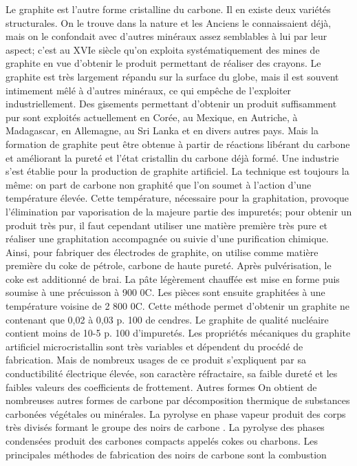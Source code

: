 \documentclass[]{article}
\begin{document}
Le graphite est l'autre forme cristalline du carbone. Il en
existe deux variétés structurales. On le trouve dans la nature
et les Anciens le connaissaient déjà, mais on le confondait avec
d'autres minéraux assez semblables à lui par leur aspect; c'est
au XVIe siècle qu'on exploita systématiquement des mines de
graphite en vue d'obtenir le produit permettant de réaliser des
crayons. Le graphite est très largement répandu sur la surface
du globe, mais il est souvent intimement mêlé à d'autres
minéraux, ce qui empêche de l'exploiter industriellement. Des
gisements permettant d'obtenir un produit suffisamment pur sont
exploités actuellement en Corée, au Mexique, en Autriche, à
Madagascar, en Allemagne, au Sri Lanka et en divers autres pays.  Mais
la formation de graphite peut être obtenue à partir de
réactions libérant du carbone et améliorant la pureté et
l'état cristallin du carbone déjà formé. Une industrie
s'est établie pour la production de graphite artificiel. La
technique est toujours la même: on part de carbone non graphité
que l'on soumet à l'action d'une température élevée. Cette
température, nécessaire pour la graphitation, provoque
l'élimination par vaporisation de la majeure partie des
impuretés; pour obtenir un produit très pur, il faut cependant
utiliser une matière première très pure et réaliser une
graphitation accompagnée ou suivie d'une purification
chimique. Ainsi, pour fabriquer des électrodes de graphite, on
utilise comme matière première du coke de pétrole, carbone de
haute pureté. Après pulvérisation, le coke est additionné
de brai. La pâte légèrement chauffée est mise en forme
puis soumise à une précuisson à 900 0C. Les pièces sont
ensuite graphitées à une température voisine de
2 800 0C. Cette méthode permet d'obtenir un graphite ne
contenant que 0,02 à 0,03 p. 100 de cendres. Le graphite de
qualité nucléaire contient moins de 10-5 p. 100
d'impuretés. Les propriétés mécaniques du graphite
artificiel microcristallin sont très variables et dépendent du
procédé de fabrication. Mais de nombreux usages de ce produit
s'expliquent par sa conductibilité électrique élevée, son
caractère réfractaire, sa faible dureté et les faibles
valeurs des coefficients de frottement.  Autres formes On obtient de
nombreuses autres formes de carbone par décomposition thermique de
substances carbonées végétales ou minérales. La pyrolyse
en phase vapeur produit des corps très divisés formant le groupe
des noirs de carbone . La pyrolyse des phases condensées produit
des carbones compacts appelés cokes ou charbons. Les principales
méthodes de fabrication des noirs de carbone sont la combustion
\end{document}
